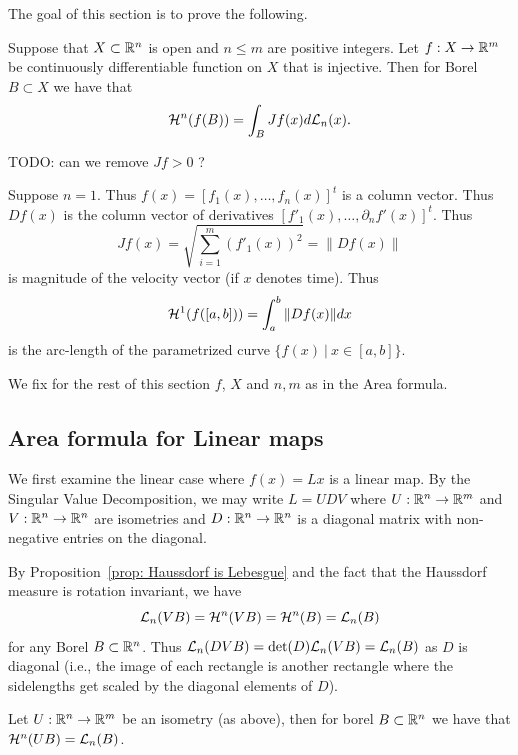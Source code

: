 \documentclass[twoside, a4paper, 10pt]{amsart}
\begin{document}
The goal of this section is to prove the following.

\begin{thm}\label{thm: Area formula} Suppose that $X \subset \mathbb{R}^n$ is open and $n \leq m$ are positive integers. Let $f:X \to \mathbb{R}^m$ be continuously differentiable function on $X$ that is injective. Then for Borel $B \subset X$ we have that $$\mathcal{H}^n(f(B)) = \int_B Jf(x) d\mathcal{L}_n(x).$$

\end{thm}

TODO: can we remove $Jf>0$ ?

\begin{eg} Suppose $n=1$. Thus $f(x) = [f_1(x), \ldots, f_n(x)]^t$ is a column vector. Thus $Df(x)$ is the column vector of derivatives $[f'_1(x), \ldots, \partial_n f'(x)]^t$. Thus $$Jf(x) = \sqrt{\sum_{i=1}^m (f'_1(x))^2} = \| Df(x)\|$$ is magnitude of the velocity vector (if $x$ denotes time). Thus $$ \mathcal{H}^1(f([a,b])) = \int_{a}^b \|Df(x)\| dx$$ is the arc-length of the parametrized curve $\{ f(x) ~|~ x \in [a,b]\}$.

\end{eg}

We fix for the rest of this section $f$, $X$ and $n,m$ as in the Area formula.

\subsection{Area formula for Linear maps} We first examine the linear case where $f(x) = Lx$ is a linear map. By the Singular Value Decomposition, we may write $L = UDV$ where $U:\mathbb{R}^n \to \mathbb{R}^m$ and $V:\mathbb{R}^n \to \mathbb{R}^n$ are isometries and $D:\mathbb{R}^n \to \mathbb{R}^n$ is a diagonal matrix with non-negative entries on the diagonal.

By Proposition~\ref{prop: Haussdorf is Lebesgue} and the fact that the Haussdorf measure is rotation invariant, we have $$\mathcal{L}_n(VB) = \mathcal{H}^n(VB) = \mathcal{H}^n(B) = \mathcal{L}_n(B)$$ for any Borel $B \subset \mathbb{R}^n$. Thus $\mathcal{L}_n(DVB) = \det(D) \mathcal{L}_n(VB) = \mathcal{L}_n(B)$ as $D$ is diagonal (i.e., the image of each rectangle is another rectangle where the sidelengths get scaled by the diagonal elements of $D$).

\begin{lemma} Let $U:\mathbb{R}^n \to \mathbb{R}^m$ be an isometry (as above), then for borel $B \subset \mathbb{R}^n$ we have that $\mathcal{H}^n(UB) = \mathcal{L}_n(B)$.

\end{lemma}
\end{document}
